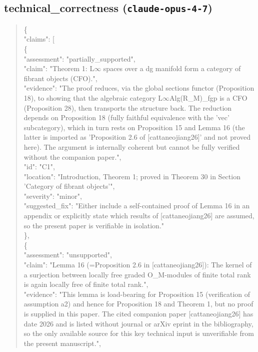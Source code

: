\documentclass[11pt]{article}
\begin{document}
\subsection*{technical\_correctness (\texttt{claude-opus-4-7})}
\begin{quote}\small\ttfamily\raggedright
\{\\
  "claims": [\\
    \{\\
      "assessment": "partially\_supported",\\
      "claim": "Theorem 1: L\ensuremath{\infty} spaces over a dg manifold form a category of fibrant objects (CFO).",\\
      "evidence": "The proof reduces, via the global sections functor (Proposition 18), to showing that the algebraic category L\ensuremath{\infty}Alg(R\_M)\_fgp is a CFO (Proposition 28), then transports the structure back. The reduction depends on Proposition 18 (fully faithful equivalence with the 'vec' subcategory), which in turn rests on Proposition 15 and Lemma 16 (the latter is imported as 'Proposition 2.6 of [cattaneojiang26]' and not proved here). The argument is internally coherent but cannot be fully verified without the companion paper.",\\
      "id": "C1",\\
      "location": "Introduction, Theorem 1; proved in Theorem 30 in Section 'Category of fibrant objects'",\\
      "severity": "minor",\\
      "suggested\_fix": "Either include a self-contained proof of Lemma 16 in an appendix or explicitly state which results of [cattaneojiang26] are assumed, so the present paper is verifiable in isolation."\\
    \},\\
    \{\\
      "assessment": "unsupported",\\
      "claim": "Lemma 16 (=Proposition 2.6 in [cattaneojiang26]): The kernel of a surjection between locally free graded O\_M-modules of finite total rank is again locally free of finite total rank.",\\
      "evidence": "This lemma is load-bearing for Proposition 15 (verification of assumption a2) and hence for Proposition 18 and Theorem 1, but no proof is supplied in this paper. The cited companion paper [cattaneojiang26] has date 2026 and is listed without journal or arXiv eprint in the bibliography, so the only available source for this key technical input is unverifiable from the present manuscript.",\\

\end{quote}
\end{document}
